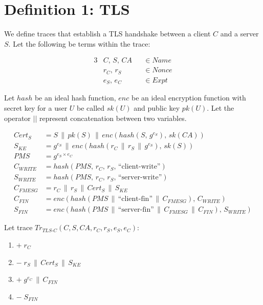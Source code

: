 \documentclass[12pt]{article}
\newcommand{\concat}{\,\|\,}
\newcommand{\enc}[2]{enc(#1,\,#2)}
\newcommand{\hash}[1]{hash(#1)}
\newcommand{\pk}[1]{\mathit{pk}(#1)}
\newcommand{\sk}[1]{\mathit{sk}(#1)}
\begin{document}
\vfill
\pagebreak

\section{Definition 1: TLS}
\label{def:tls}

We define traces that establish a TLS handshake between a client $C$ and a server $S$.
Let the following be terms within the trace:

\begin{alignat*}{3}
  &C,\, S,\, CA &&\in \mathit{Name} \\
  &r_C,\, r_S   &&\in \mathit{Nonce} \\
  &e_S,\, e_C   &&\in \mathit{Expt}
\end{alignat*}

Let \(hash\) be an ideal hash function, \(enc\) be an ideal encryption function with secret key for a user \(U\) be called \(sk(U)\) and public key \(pk(U)\).
Let the operator \(||\) represent concatenation between two variables.

\begin{align*}
  \mathit{Cert}_S  &= S \concat \pk{S} \concat \enc{\hash{S,\, g^{e_S}}}{\sk{CA}} \\
  S_{KE}           &= g^{e_S} \concat \enc{\hash{r_C \concat r_S \concat g^{e_S}}}{\sk{S}} \\
  \mathit{PMS}     &= g^{e_S \times e_C} \\
  C_{\mathit{WRITE}} &= \hash{\mathit{PMS},\, r_C,\, r_S,\, \text{``client-write''}} \\
  S_{\mathit{WRITE}} &= \hash{\mathit{PMS},\, r_C,\, r_S,\, \text{``server-write''}} \\
  C_{\mathit{FMESG}} &= r_C \concat r_S \concat \mathit{Cert}_S \concat S_{KE} \\
  C_{\mathit{FIN}}   &= \enc{\hash{\mathit{PMS} \concat \text{``client-fin''} \concat C_{\mathit{FMESG}}}}{C_{\mathit{WRITE}}} \\
  S_{\mathit{FIN}}   &= \enc{\hash{\mathit{PMS} \concat \text{``server-fin''} \concat C_{\mathit{FMESG}} \concat C_{\mathit{FIN}}}}{S_{\mathit{WRITE}}}
\end{align*}

Let trace $\mathit{Tr}_{\mathit{TLS\text{-}C}}(C, S, CA, r_C, r_S, e_S, e_C)$:

\begin{enumerate}[label=\arabic*.,noitemsep]
  \item $+\; r_C$
  \item $-\; r_S \concat \mathit{Cert}_S \concat S_{KE}$
  \item $+\; g^{e_C} \concat C_{\mathit{FIN}}$
  \item $-\; S_{\mathit{FIN}}$
\end{enumerate}
\end{document}
